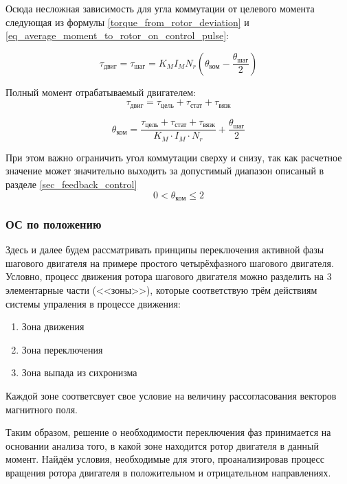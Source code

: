 Осюда несложная зависимость для угла коммутации от целевого момента следующая из
формулы \ref{torque_from_rotor_deviation}
и \ref{eq_average_moment_to_rotor_on_control_pulse}:

$$
    \tau_\textit{двиг} =
        \tau_{\textit{шаг}} =
            K_{M} I_{M} N_{r} ( \theta_{\textit{ком}}
                                - \frac{ \theta_{\textit{шаг}} }{ 2 }
            )
$$

Полный момент отрабатываемый двигателем:
\begin{equation}
    \label{eq_motor_torque}
    \tau_\textit{двиг} =
        \tau_\textit{цель}
        + \tau_\textit{стат}
        + \tau_\textit{вязк}
\end{equation}

\begin{equation}
    \label{eq_commutation_angle}
    \theta_{\textit{ком}} =
    \frac{ \tau_\textit{цель} + \tau_\textit{стат} + \tau_\textit{вязк} }
         { K_{M} \cdot I_{M} \cdot N_{r} }
    + \frac{ \theta_{\textit{шаг}} }{ 2 }
\end{equation}

При этом важно ограничить угол коммутации сверху и снизу, так как расчетное
значение может значительно выходить за допустимый диапазон описаный в разделе
\ref{sec_feedback_control}
$$
    0 < \theta_{\textit{ком}} \leq 2
$$

\clearpage
\subsubsection{ОС по положению}
\label{fedback_control_algo}
Здесь и далее будем рассматривать принципы переключения активной фазы шагового
двигателя на примере простого четырёхфазного шагового двигателя.
Условно, процесс движения ротора шагового двигателя можно разделить на 3
элементарные части (<<зоны>>), которые соответствую трём действиям системы
упраления в процессе движения:

\begin{enumerate}
    \item Зона движения
    \item Зона переключения
    \item Зона выпада из сихронизма
\end{enumerate}

Каждой зоне соответсвует свое условие на величину рассогласования векторов
магнитного поля.

Таким образом, решение о необходимости переключения фаз принимается на основании
анализа того, в какой зоне находится ротор двигателя в данный момент. Найдём
условия, необходимые для этого, проанализировав процесс вращения ротора
двигателя в положительном и отрицательном направлениях.

